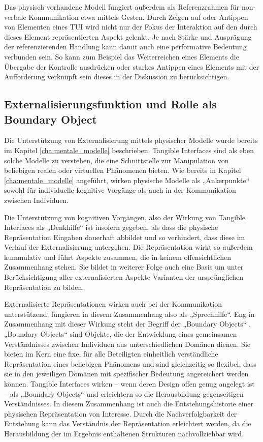 Das physisch vorhandene Modell fungiert außerdem als Referenzrahmen für non-verbale Kommunikation etwa mittels Gesten. Durch Zeigen auf oder Antippen von Elementen eines \gls{TUI} wird nicht nur der Fokus der Interaktion auf den durch dieses Element repräsentierten Aspekt gelenkt. Je nach Stärke und Ausprägung der referenzierenden Handlung kann damit auch eine performative Bedeutung verbunden sein. So kann zum Beispiel das Weiterreichen eines Elements die Übergabe der Kontrolle ausdrücken oder starkes Antippen eines Elements mit der Aufforderung verknüpft sein dieses in der Diskussion zu berücksichtigen.


\subsection{Externalisierungsfunktion und Rolle als Boundary Object} %
\label{sub:externalisierungsfunktion_und_rolle_als_boundary_object}

Die Unterstützung von Externalisierung mittels physischer Modelle wurde bereits im Kapitel \ref{cha:mentale_modelle} beschrieben. Tangible Interfaces sind als eben solche Modelle zu verstehen, die eine Schnittstelle zur Manipulation von beliebigen realen oder virtuellen Phänomenen bieten. Wie bereits in Kapitel \ref{cha:mentale_modelle} angeführt, wirken physische Modelle als „Ankerpunkte“ sowohl für individuelle kognitive Vorgänge als auch in der Kommunikation zwischen Individuen.

Die Unterstützung von kognitiven Vorgängen, also der Wirkung von Tangible Interfaces als „Denkhilfe“ ist insofern gegeben, als dass die physische Repräsentation Eingaben dauerhaft abbildet und so verhindert, dass diese im Verlauf der Externalisierung untergehen. Die Repräsentation wirkt so außerdem kummulativ und führt Aspekte zusammen, die in keinem offensichtlichen Zusammenhang stehen. Sie bildet in weiterer Folge auch eine Basis um unter Berücksichtigung aller externalisierten Aspekte Varianten der ursprünglichen Repräsentation zu bilden.  

Externalisierte Repräsentationen wirken auch bei der Kommunikation unterstützend, fungieren in diesem Zusammenhang also als „Sprechhilfe“. Eng in Zusammenhang mit dieser Wirkung steht der Begriff der „Boundary Objects“ \citep{Star89}. „Boundary Objects“ sind Objekte, die der Entwicklung eines gemeinsamen Verständnisses zwischen Individuen aus unterschiedlichen Domänen dienen. Sie bieten im Kern eine fixe, für alle Beteiligten einheitlich verständliche Repräsentation eines beliebigen Phänomens und sind gleichzeitig so flexibel, dass sie in den jeweiligen Domänen mit spezifischer Bedeutung angereichert werden können. Tangible Interfaces wirken -- wenn deren Design offen genug angelegt ist -- als „Boundary Objects“ und erleichtern so die Herausbildung gegenseitigen Verständnisses. In diesem Zusammenhang ist auch die Entstehungshistorie einer physischen Repräsentation von Interesse. Durch die Nachverfolgbarkeit der Entstehung kann das Verständnis der Repräsentation erleichtert werden, da die Herausbildung der im Ergebnis enthaltenen Strukturen nachvollziehbar wird.

